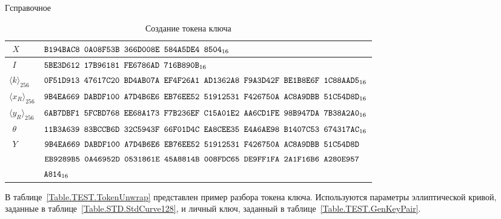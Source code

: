 \begin{appendix}{Г}{справочное}
\begin{table}[!h]
\caption{Создание токена ключа}\label{Table.TEST.TokenWrap}
{\small
\begin{tabular}{|l|l|}
%
\hline
$\phantom{\langle}X$ & 
$\texttt{B194BAC8~0A08F53B~366D008E~584A5DE4~8504}_{16}$\\
%
\hline
$\phantom{\langle}I$ & 
$\texttt{5BE3D612~17B96181~FE6786AD~716B890B}_{16}$\\
%
\hline
\hline
$\langle k\rangle_{256}$ & 
$\texttt{0F51D913~47617C20~BD4AB07A~EF4F26A1~AD1362A8~F9A3D42F~BE1B8E6F~1C88AAD5}_{16}$\\
%
\hline
$\langle x_R\rangle_{256}$ & 
$\texttt{9B4EA669~DABDF100~A7D4B6E6~EB76EE52~51912531~F426750A~AC8A9DBB~51C54D8D}_{16}$\\
%
\hline
$\langle y_R\rangle_{256}$ & 
$\texttt{6AB7DBF1~5FCBD768~EE68A173~F7B236EF~C15A01E2~AA6CD1FE~98B947DA~7B38A2A0}_{16}$\\
%
\hline
$\phantom{\langle}\theta$ & 
$\texttt{11B3A639~83BCCB6D~32C5943F~66F01D4C~EA8CEE35~E4A6AE98~B1407C53~674317AC}_{16}$\\
%
\dhline
$\phantom{\langle}Y$ & 
$\texttt{9B4EA669~DABDF100~A7D4B6E6~EB76EE52~51912531~F426750A~AC8A9DBB~51C54D8D}$\\
&
$\texttt{EB9289B5~0A46952D~0531861E~45A8814B~008FDC65~DE9FF1FA~2A1F16B6~A280E957}$\\
& 
$\texttt{A814}_{16}$\\
\hline
\end{tabular}
}
\end{table}

\label{TEST.TokenUnwrap}

В таблице~\ref{Table.TEST.TokenUnwrap} представлен пример разбора токена ключа.
%
Используются параметры эллиптической кривой, 
заданные в таблице~\ref{Table.STD.StdCurve128},
и личный ключ, заданный в таблице~\ref{Table.TEST.GenKeyPair}.


\end{appendix}
